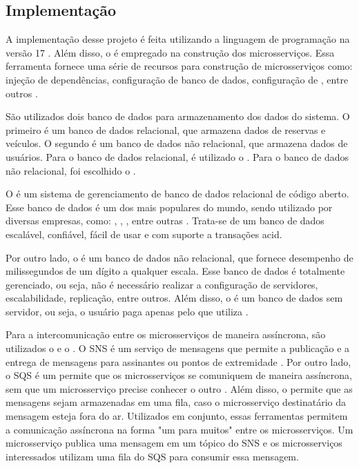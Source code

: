 \subsection{Implementação}
A implementação desse projeto é feita utilizando a linguagem de programação  na versão 17 \cite{java}. Além disso, o   é empregado na construção dos microsserviços. Essa ferramenta fornece uma série de recursos para construção de microsserviços como: injeção de dependências, configuração de banco de dados, configuração de , entre outros \cite{springBoot}. 

São utilizados dois banco de dados para armazenamento dos dados do sistema. O primeiro é um banco de dados relacional, que armazena dados de reservas e veículos. O segundo é um banco de dados não relacional, que armazena dados de usuários. Para o banco de dados relacional, é utilizado o  \cite{postgreSql}. Para o banco de dados não relacional, foi escolhido o  \cite{dynamoDb}.

O  é um sistema de gerenciamento de banco de dados relacional de código aberto. Esse banco de dados é um dos mais populares do mundo, sendo utilizado por diversas empresas, como: , , , entre outras \cite{postgreSql}. Trata-se de um banco de dados escalável, confiável, fácil de usar e com suporte a transações \acrshort{acid}.

Por outro lado, o  é um banco de dados não relacional, que fornece desempenho de milissegundos de um dígito a qualquer escala. Esse banco de dados é totalmente gerenciado, ou seja, não é necessário realizar a configuração de servidores, escalabilidade, replicação, entre outros. Além disso, o  é um banco de dados sem servidor, ou seja, o usuário paga apenas pelo que utiliza \cite{dynamoDb}.

Para a intercomunicação entre os microsserviços de maneira assíncrona, são utilizados o  e o . O SNS é um serviço de mensagens que permite a publicação e a entrega de mensagens para assinantes ou pontos de extremidade \cite{amazonSns}. Por outro lado, o SQS é um  permite que os microsserviços se comuniquem de maneira assíncrona, sem que um microsserviço precise conhecer o outro \cite{amazonSqs}. Além disso, o  permite que as mensagens sejam armazenadas em uma fila, caso o microsserviço destinatário da mensagem esteja fora do ar. Utilizados em conjunto, essas ferramentas permitem a comunicação assíncrona na forma "um para muitos" entre os microsserviços. Um microsserviço publica uma mensagem em  um tópico do SNS e os microsserviços interessados utilizam uma fila do SQS para consumir essa mensagem.

